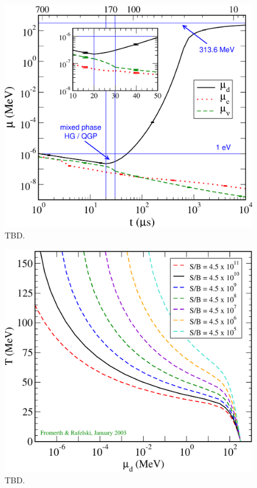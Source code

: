 \documentclass[Universe,article,submit,moreauthors,pdftex]{Definitions/mdpi}
\begin{document}
\begin{figure}[h]
  \centering
  \includegraphics[width=\linewidth]{./extra/muCombo.pdf}
  \caption{TBD.}
  \label{QGPchem} 
\end{figure}
\begin{figure}[h]
  \centering
  \includegraphics[width=\linewidth]{./extra/Tmud1.pdf}
  \caption{TBD.}
  \label{QGPchem} 
\end{figure}
\end{document}

